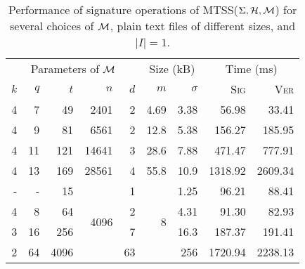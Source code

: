 \begin{table}[htbp]
  \setlength{\tabcolsep}{10pt}
  \centering
  \caption{Performance of signature operations of MTSS($\Sigma, \mathcal{H}, \mathcal{M}$) for several choices of $\mathcal{M}$, plain text files of different sizes, and $|I| = 1$.}
  \begin{tabular}{rrrrrrrrr}
    \toprule
    \multicolumn{5}{c}{Parameters of $\mathcal{M}$} & \multicolumn{2}{c}{Size  (kB)} & \multicolumn{2}{c}{Time (ms)} \\
    \cmidrule(lr){1-5} \cmidrule(lr){6-7} \cmidrule(lr){8-9}
    $k$ & $q$ & $t$ & $n$ & $d$ & $m$ & $\sigma$ & \textsc{Sig} & \textsc{Ver} \\
    \midrule
    4 & 7  & 49   & 2401  & 2  & 4.69 & 3.38 & 56.98   & 33.41   \\
    4 & 9  & 81   & 6561  & 2  & 12.8 & 5.38 & 156.27  & 185.95  \\
    4 & 11 & 121  & 14641 & 3  & 28.6 & 7.88 & 471.47  & 777.91  \\
    4 & 13 & 169  & 28561 & 4  & 55.8 & 10.9 & 1318.92 & 2609.34 \\
    \midrule
     - &  -  & 15   & \multirow{4}{*}{4096}  & 1  & \multirow{4}{*}{8}    & 1.25 & 96.21   & 88.41   \\
    4 & 8  & 64   &   & 2  &    & 4.31 & 91.30   & 82.93   \\
    3 & 16 & 256  &   & 7  &    & 16.3 & 187.37  & 191.41  \\
    2 & 64 & 4096 &   & 63 &    & 256  & 1720.94 & 2238.13 \\
    \bottomrule
  \end{tabular}
  \label{table:sign-locate-different-parameters}
\end{table}